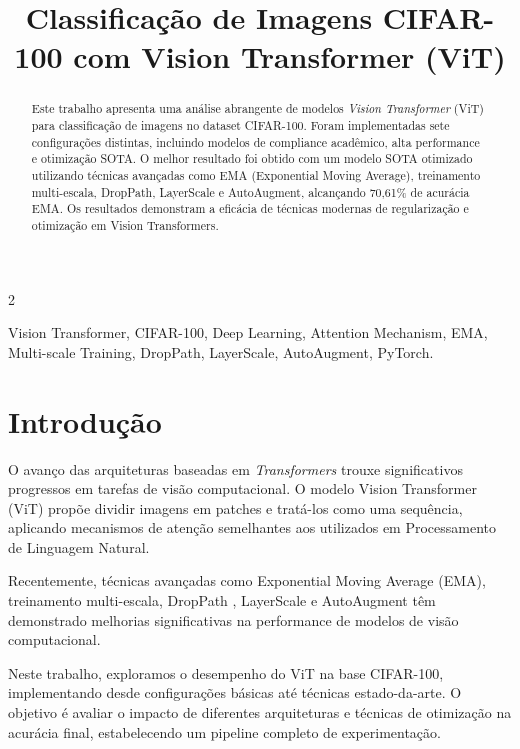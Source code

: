 \documentclass[conference]{IEEEtran}
\title{Classificação de Imagens CIFAR-100 com Vision Transformer (ViT)}
\author{
\IEEEauthorblockN{Diego Giovanni de Alcântara Vieira}
\IEEEauthorblockA{
Universidade Federal do Amazonas (UFAM)\\
Manaus, AM, Brasil\\
Email: diego.vieira@ufam.edu.br}
}
\begin{document}
\maketitle

\begin{multicols}{2}

\begin{abstract}
Este trabalho apresenta uma análise abrangente de modelos \textit{Vision Transformer} (ViT) para classificação de imagens no dataset CIFAR-100. Foram implementadas sete configurações distintas, incluindo modelos de compliance acadêmico, alta performance e otimização SOTA. O melhor resultado foi obtido com um modelo SOTA otimizado utilizando técnicas avançadas como EMA (Exponential Moving Average), treinamento multi-escala, DropPath, LayerScale e AutoAugment, alcançando 70,61\% de acurácia EMA. Os resultados demonstram a eficácia de técnicas modernas de regularização e otimização em Vision Transformers.
\end{abstract}

\begin{IEEEkeywords}
Vision Transformer, CIFAR-100, Deep Learning, Attention Mechanism, EMA, Multi-scale Training, DropPath, LayerScale, AutoAugment, PyTorch.
\end{IEEEkeywords}


\section{Introdução}
O avanço das arquiteturas baseadas em \textit{Transformers} trouxe significativos progressos em tarefas de visão computacional. O modelo Vision Transformer (ViT) \cite{dosovitskiy2020image} propõe dividir imagens em patches e tratá-los como uma sequência, aplicando mecanismos de atenção semelhantes aos utilizados em Processamento de Linguagem Natural.

Recentemente, técnicas avançadas como Exponential Moving Average (EMA), treinamento multi-escala, DropPath \cite{larsson2016fractalnet}, LayerScale \cite{touvron2021going} e AutoAugment \cite{cubuk2019autoaugment} têm demonstrado melhorias significativas na performance de modelos de visão computacional.

Neste trabalho, exploramos o desempenho do ViT na base CIFAR-100, implementando desde configurações básicas até técnicas estado-da-arte. O objetivo é avaliar o impacto de diferentes arquiteturas e técnicas de otimização na acurácia final, estabelecendo um pipeline completo de experimentação.



\end{multicols}
\end{document}
